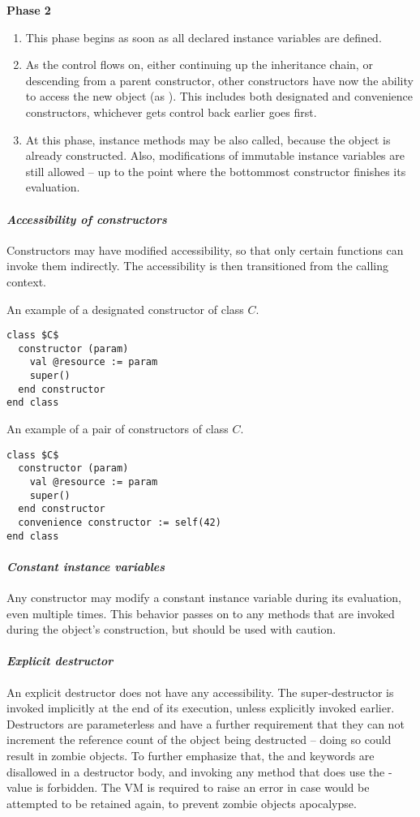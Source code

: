 {\bfseries Phase 2}
\begin{enumerate}
  \item This phase begins as soon as all declared instance variables are defined.
  \item As the control flows on, either continuing up the inheritance chain, or descending from a parent constructor, other constructors have now the ability to access the new object (as ). This includes both designated and convenience constructors, whichever gets control back earlier goes first. 
  \item At this phase, instance methods may be also called, because the object is already constructed. Also, modifications of immutable instance variables are still allowed -- up to the point where the bottommost constructor finishes its evaluation. 
\end{enumerate}

\paragraph{\em Accessibility of constructors}
Constructors may have modified accessibility, so that only certain functions can invoke them indirectly. The accessibility is then transitioned from the calling context. 

\example An example of a designated constructor of class $C$.
\begin{lstlisting}
class $C$
  constructor (param)
    val @resource := param
    super()
  end constructor
end class
\end{lstlisting}

\example An example of a pair of constructors of class $C$. 
\begin{lstlisting}
class $C$
  constructor (param)
    val @resource := param
    super()
  end constructor
  convenience constructor := self(42)
end class
\end{lstlisting}

\paragraph{\em Constant instance variables}
Any constructor may modify a constant instance variable during its evaluation, even multiple times. This behavior passes on to any methods that are invoked during the object's construction, but should be used with caution. 

\paragraph{\em Explicit destructor}
An explicit destructor does not have any accessibility. The super-destructor is invoked implicitly at the end of its execution, unless explicitly invoked earlier. Destructors are parameterless and have a further requirement that they can not increment the reference count of the object being destructed -- doing so could result in zombie objects. To further emphasize that, the  and  keywords are disallowed in a destructor body, and invoking any method that does use the -value is forbidden. The VM is required to raise an error in case  would be attempted to be retained again, to prevent zombie objects apocalypse. 

